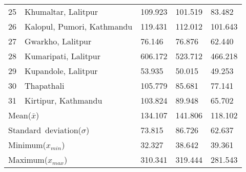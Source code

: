 \begin{tabularx}{\textwidth}{ | l | p{} | X | X | X | }
 25 & Khumaltar, Lalitpur  & 109.923 & 101.519 & 83.482 \\
 26 & Kalopul, Pumori, Kathmandu & 119.431 & 112.012 & 101.643 \\
 27 & Gwarkho, Lalitpur & 76.146 & 76.876 & 62.440 \\
 28 & Kumaripati, Lalitpur & 606.172 & 523.712 & 466.218 \\
 29 & Kupandole, Lalitpur & 53.935 & 50.015 & 49.253 \\
 30 & Thapathali & 105.779 & 85.681 & 77.141 \\
 31 & Kirtipur, Kathmandu & 103.824 & 89.948 & 65.702 \\
\hline
\multicolumn{2}{|X|}{\mbox{Mean($\overline{x}$)}} & 134.107 & 141.806 & 118.102 \\
\multicolumn{2}{|X|}{\mbox{Standard deviation($\sigma$)}} & 73.815 & 86.726 & 62.637 \\
\multicolumn{2}{|X|}{\mbox{Minimum($x_{min}$)}} & 32.327 & 38.642 & 39.361 \\
\multicolumn{2}{|X|}{\mbox{Maximum($x_{max}$)}} & 310.341 & 319.444 & 281.543 \\
\hline
\end{tabularx}
